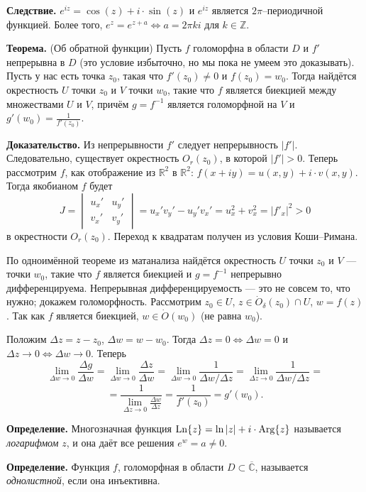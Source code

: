 \textbf{Следствие.} $e^{iz} = \cos(z) + i \cdot \sin(z)$ и $e^{iz}$ является $2\pi$--периодичной функцией.
Более того, $e^z = e^{z + a} \iff a = 2\pi k i$ для $k \in \mathbb Z$.

\textbf{Теорема.} (Об обратной функции) Пусть $f$ голоморфна в области $D$ и $f'$ непрерывна в $D$ (это условие избыточно, но мы пока не умеем это доказывать).
Пусть у нас есть точка $z_0$, такая что $f'(z_0) \ne 0$ и $f(z_0) = w_0$.
Тогда найдётся окрестность $U$ точки $z_0$ и $V$ точки $w_0$, такие что $f$ является биекцией между множествами $U$ и $V$, причём $g = f^{-1}$ является голоморфной на $V$ и $g'(w_0) = \frac{1}{f'(z_0)}$.

\textbf{Доказательство.} Из непрерывности $f'$ следует непрерывность $|f'|$.
Следовательно, существует окрестность $O_r(z_0)$, в которой $|f'| > 0$.
Теперь рассмотрим $f$, как отображение из $\mathbb R^2$ в $\mathbb R^2$: $f(x + iy) = u(x, y) + i \cdot v(x, y)$.
Тогда якобианом $f$ будет
\[
    J =
    \begin{vmatrix}
        u_x' & u_y' \\
        v_x' & v_y'
    \end{vmatrix}
    = u_x' v_y' - u_y' v_x' = u_x^2 + v_x^2 = |f'_x|^2 > 0
\]
в окрестности $O_r(z_0)$.
Переход к квадратам получен из условия Коши--Римана.

По одноимённой теореме из матанализа найдётся окрестность $U$ точки $z_0$ и $V$ --- точки $w_0$, такие что $f$ является биекцией и $g = f^{-1}$ непрерывно дифференцируема.
Непрерывная дифференцируемость --- это не совсем то, что нужно; докажем голоморфность.
Рассмотрим $z_0 \in U$, $z \in \dot O_\delta(z_0) \cap U$, $w = f(z)$.
Так как $f$ является биекцией, $w \in \dot O(w_0)$ (не равна $w_0$).

Положим $\Delta z = z - z_0$, $\Delta w = w - w_0$.
Тогда $\Delta z = 0 \iff \Delta w = 0$ и $\Delta z \to 0 \iff \Delta w \to 0$.
Теперь
\[
    \lim_{\Delta w \to 0} \frac{\Delta g}{\Delta w} = \lim_{\Delta w \to 0} \frac{\Delta z}{\Delta w} = \lim_{\Delta w \to 0} \frac{1}{\Delta w / \Delta z} = \lim_{\Delta z \to 0} \frac{1}{\Delta w / \Delta z} =
\]
\[
    = \frac{1}{\lim_{\Delta z \to 0} \frac{\Delta w}{\Delta z}} = \frac{1}{f'(z_0)} = g'(w_0).
\]

\QED

\textbf{Определение.} Многозначная функция $\operatorname{Ln}\{z\} = \ln|z| + i \cdot \operatorname{Arg}\{z\}$ называется \textit{логарифмом} $z$, и она даёт все решения $e^w = a \ne 0$.

\textbf{Определение.} Функция $f$, голоморфная в области $D \subset \overline {\mathbb C}$, называется \textit{однолистной}, если она инъективна.


